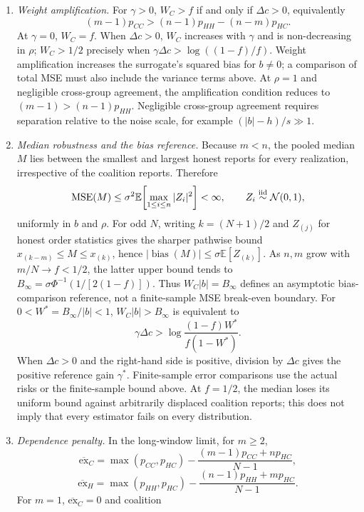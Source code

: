 \documentclass[
  12pt,
]{article}
\begin{document}
\begin{enumerate}
\def\labelenumi{\arabic{enumi}.}
\item
  \emph{Weight amplification.} For \(\gamma>0\), \(W_C>f\) if and only
  if \(\Delta c>0\), equivalently \[
  (m-1)p_{CC}>(n-1)p_{HH}-(n-m)p_{HC}.
  \] At \(\gamma=0\), \(W_C=f\). When \(\Delta c>0\), \(W_C\) increases
  with \(\gamma\) and is non-decreasing in \(\rho\); \(W_C>1/2\)
  precisely when \(\gamma\Delta c>\log((1-f)/f)\). Weight amplification
  increases the surrogate's squared bias for \(b\ne0\); a comparison of
  total MSE must also include the variance terms above. At \(\rho=1\)
  and negligible cross-group agreement, the amplification condition
  reduces to \((m-1)>(n-1)p_{HH}\). Negligible cross-group agreement
  requires separation relative to the noise scale, for example
  \((|b|-h)/s\gg1\).
\item
  \emph{Median robustness and the bias reference.} Because \(m<n\), the
  pooled median \(M\) lies between the smallest and largest honest
  reports for every realization, irrespective of the coalition reports.
  Therefore \[
  \operatorname{MSE}(M)\le\sigma^2\mathbb E\!\left[\max_{1\le i\le n}|Z_i|^2\right]<\infty,
  \qquad Z_i\stackrel{\rm iid}{\sim}\mathcal N(0,1),
  \] uniformly in \(b\) and \(\rho\). For odd \(N\), writing
  \(k=(N+1)/2\) and \(Z_{(j)}\) for honest order statistics gives the
  sharper pathwise bound \(x_{(k-m)}\le M\le x_{(k)}\), hence
  \(|\operatorname{bias}(M)|\le\sigma\mathbb E[Z_{(k)}]\). As \(n,m\)
  grow with \(m/N\to f<1/2\), the latter upper bound tends to
  \(B_\infty=\sigma\Phi^{-1}(1/[2(1-f)])\). Thus \(W_C|b|=B_\infty\)
  defines an asymptotic bias-comparison reference, not a finite-sample
  MSE break-even boundary. For \(0<W^*=B_\infty/|b|<1\),
  \(W_C|b|>B_\infty\) is equivalent to \[
  \gamma\Delta c>\log\!\frac{(1-f)W^*}{f(1-W^*)}.
  \] When \(\Delta c>0\) and the right-hand side is positive, division
  by \(\Delta c\) gives the positive reference gain \(\gamma^*\).
  Finite-sample error comparisons use the actual risks or the
  finite-sample bound above. At \(f=1/2\), the median loses its uniform
  bound against arbitrarily displaced coalition reports; this does not
  imply that every estimator fails on every distribution.
\item
  \emph{Dependence penalty.} In the long-window limit, for \(m\ge2\), \[
  \overline{\mathrm{ex}}_C=\max(p_{CC},p_{HC})-\frac{(m-1)p_{CC}+np_{HC}}{N-1},
  \] \[
  \overline{\mathrm{ex}}_H=\max(p_{HH},p_{HC})-\frac{(n-1)p_{HH}+mp_{HC}}{N-1}.
  \] For \(m=1\), \(\overline{\mathrm{ex}}_C=0\) and coalition

\end{enumerate}
\end{document}
